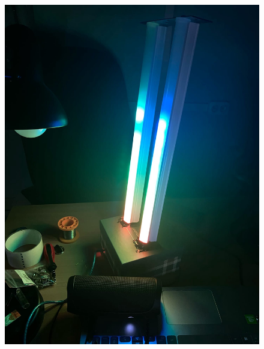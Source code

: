 \documentclass[a4paper, 12pt]{article}%
\begin{document}
\begin{figure}[!h]
\begin{center}
\includegraphics[scale=0.25]{pictures/bea1.jpg}
\end{center}
\end{figure}

\newpage
\end{document}
